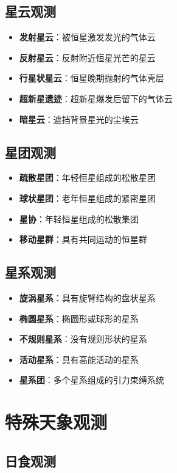 \documentclass[12pt,UTF8]{ctexbook}
\begin{document}
\section{星云观测}

\begin{itemize}
  \item \textbf{发射星云}：被恒星激发发光的气体云
  \item \textbf{反射星云}：反射附近恒星光芒的星云
  \item \textbf{行星状星云}：恒星晚期抛射的气体壳层
  \item \textbf{超新星遗迹}：超新星爆发后留下的气体云
  \item \textbf{暗星云}：遮挡背景星光的尘埃云
\end{itemize}

\section{星团观测}

\begin{itemize}
  \item \textbf{疏散星团}：年轻恒星组成的松散星团
  \item \textbf{球状星团}：老年恒星组成的紧密星团
  \item \textbf{星协}：年轻恒星组成的松散集团
  \item \textbf{移动星群}：具有共同运动的恒星群
\end{itemize}

\section{星系观测}

\begin{itemize}
  \item \textbf{旋涡星系}：具有旋臂结构的盘状星系
  \item \textbf{椭圆星系}：椭圆形或球形的星系
  \item \textbf{不规则星系}：没有规则形状的星系
  \item \textbf{活动星系}：具有高能活动的星系
  \item \textbf{星系团}：多个星系组成的引力束缚系统
\end{itemize}

\chapter{特殊天象观测}
\section{日食观测}
\end{document}
